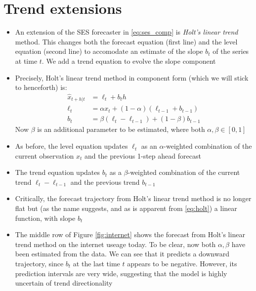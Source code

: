 \documentclass{article}
\begin{document}
\section{Trend extensions}

\begin{itemize}
\item An extension of the SES forecaster in \eqref{eq:ses_comp} is \emph{Holt's
    linear trend} method. This changes both the forecast equation (first line)
  and the level equation (second line) to accomodate an estimate of the slope
  $b_t$ of the series at time $t$. We add a trend equation to evolve the slope
  component  

\item Precisely, Holt's linear trend method in component form (which we will
  stick to henceforth) is:
  \begin{equation}
  \label{eq:holt}
  \begin{aligned}
  \hat{x}_{t+h | t} &= \ell_t + b_t h \\
  \ell_t &= \alpha x_t + (1-\alpha) (\ell_{t-1} + b_{t-1}) \\
  b_t &= \beta (\ell_t - \ell_{t-1}) + (1-\beta) b_{t-1} 
  \end{aligned}
  \end{equation}
  Now $\beta$ is an additional parameter to be estimated, where both $\alpha,
  \beta \in [0,1]$ 

\item As before, the level equation updates $\ell_t$ as an $\alpha$-weighted
  combination of the current observation $x_t$ and the previous 1-step ahead
  forecast  

\item The trend equation updates $b_t$ as a $\beta$-weighted combination of the
  current trend $\ell_t - \ell_{t-1}$ and the previous trend $b_{t-1}$

\item Critically, the forecast trajectory from Holt's linear trend method is no
  longer flat but (as the name suggests, and as is apparent from
  \eqref{eq:holt}) a linear function, with slope $b_t$

\item The middle row of Figure \ref{fig:internet} shows the forecast from Holt's
  linear trend method on the internet useage today. To be clear, now both
  $\alpha,\beta$ have been estimated from the data. We can see that it predicts
  a downward trajectory, since $b_t$ at the last time $t$ appears to be
  negative. However, its prediction intervals are very wide, suggesting that the 
  model is highly uncertain of trend directionality  
\end{itemize}
\end{document}
